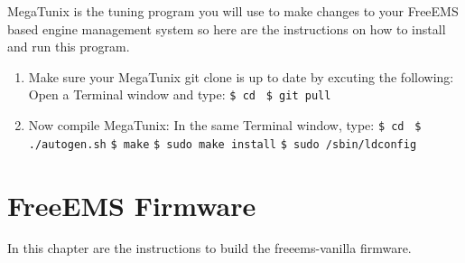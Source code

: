 \documentclass[12pt,notitlepage,onecolumn,oneside,openany]{memoir}
\begin{document}
\textsf{MegaTunix is the tuning program you will use to make changes to your FreeEMS based engine management system so here are the instructions on how to install and run this program.} \newline

\begin{enumerate}
\item \textsf{Make sure your MegaTunix git clone is up to date by excuting the following:} \newline
      \textsf{Open a Terminal window and type:} \newline
      \texttt{\$ cd }  \newline
      \texttt{\$ git pull}

\item \textsf{Now compile MegaTunix:} \newline
      \textsf{In the same Terminal window, type:} \newline
      \texttt{\$ cd }  \newline
      \texttt{\$ ./autogen.sh} \newline
      \texttt{\$ make} \newline
      \texttt{\$ sudo make install} \newline
      \texttt{\$ sudo /sbin/ldconfig} \newline
\end{enumerate}

\chapter{\textsf{FreeEMS Firmware}}

\textsf{In this chapter are the instructions to build the freeems-vanilla firmware.} \newline
\end{document}
